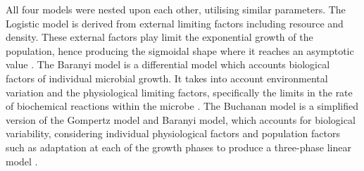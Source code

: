 \documentclass[11pt]{article}
\begin{document}
All four models were nested upon each other, utilising similar parameters. The Logistic model is derived from external limiting factors including resource and density. These external factors play limit the exponential growth of the population, hence producing the sigmoidal shape where it reaches an asymptotic value \cite{webb1986logistic}. The Baranyi model is a differential model which accounts biological factors of individual microbial growth. It takes into account environmental variation and the physiological limiting factors, specifically the limits in the rate of biochemical reactions within the microbe \cite{buchanan1997simple,grijspeerdt1999estimating}. The Buchanan model is a simplified version of the Gompertz model and Baranyi model, which accounts for biological variability, considering individual physiological factors and population factors such as adaptation at each of the growth phases to produce a three-phase linear model \cite{buchanan1997simple}.
\end{document}
